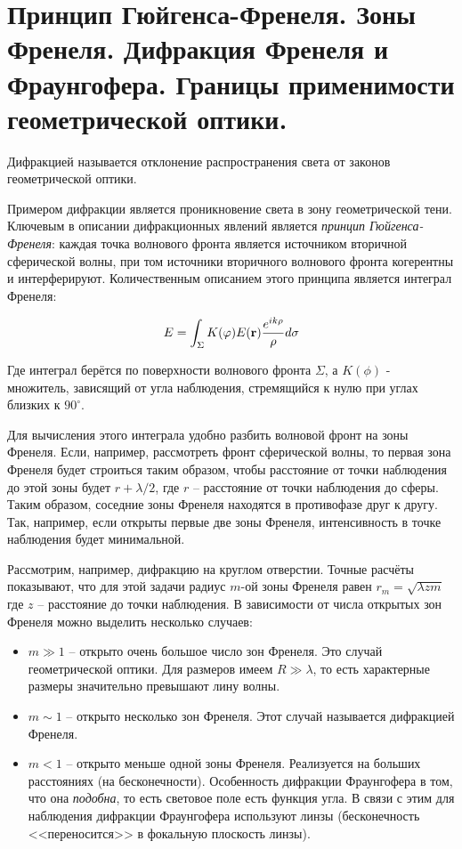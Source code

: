\section{Принцип Гюйгенса-Френеля. Зоны Френеля. Дифракция Френеля и Фраунгофера. Границы применимости геометрической оптики.}

\begin{definition}
    Дифракцией называется отклонение распространения света от законов геометрической оптики.
\end{definition}

Примером дифракции является проникновение света в зону геометрической тени. Ключевым в описании дифракционных явлений является \textit{принцип Гюйгенса-Френеля}: каждая точка волнового фронта является источником вторичной сферической волны, при том источники вторичного волнового фронта когерентны и интерферируют. Количественным описанием этого принципа является интеграл Френеля:

\begin{equation}
    E = \int_\Sigma K(\varphi) E (\mathbf r) \frac{e^{i k \rho}}{\rho} d\sigma
\end{equation}

\noindent
Где интеграл берётся по поверхности волнового фронта $\Sigma$, а $K(\phi)$ - множитель, зависящий от угла наблюдения, стремящийся к нулю при углах близких к $90^\circ$.

Для вычисления этого интеграла удобно разбить волновой фронт на зоны Френеля. Если, например, рассмотреть фронт сферической волны, то первая зона Френеля будет строиться таким образом, чтобы расстояние от точки наблюдения до этой зоны будет $r + \lambda / 2$, где $r$ -- расстояние от точки наблюдения до сферы. Таким образом, соседние зоны Френеля находятся в противофазе друг к другу. Так, например, если открыты первые две зоны Френеля, интенсивность в точке наблюдения будет минимальной.

Рассмотрим, например, дифракцию на круглом отверстии. Точные расчёты показывают, что для этой задачи радиус $m$-ой зоны Френеля равен $r_m = \sqrt{\lambda z m}$ где $z$ -- расстояние до точки наблюдения. В зависимости от числа открытых зон Френеля можно выделить несколько случаев:

\begin{itemize}
    \item $m \gg 1$ -- открыто очень большое число зон Френеля. Это случай геометрической оптики. Для размеров имеем $R \gg \lambda$, то есть характерные размеры значительно превышают лину волны.
    \item $m \sim 1$ -- открыто несколько зон Френеля. Этот случай называется дифракцией Френеля.
    \item $m < 1$ -- открыто меньше одной зоны Френеля. Реализуется на больших расстояниях (на бесконечности). Особенность дифракции Фраунгофера в том, что она \textit{подобна}, то есть световое поле есть функция угла. В связи с этим для наблюдения дифракции Фраунгофера используют линзы (бесконечность <<переносится>> в фокальную плоскость линзы).
\end{itemize}